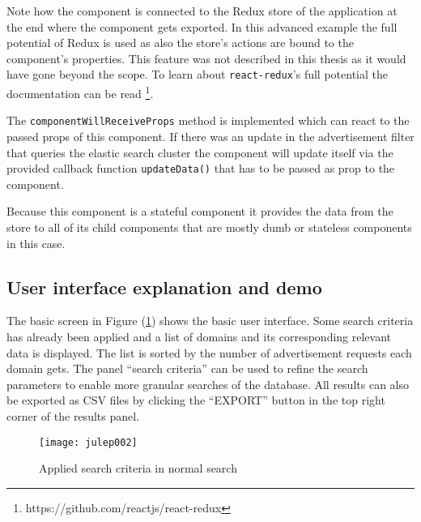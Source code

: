 Note how the component is connected to the Redux store of the application at the end where the component gets exported. In this advanced example the full potential of Redux is used as also the store's actions are bound to the component's properties. This feature was not described in this thesis as it would have gone beyond the scope. To learn about \texttt{react-redux}'s full potential the documentation can be read \footnote{https://github.com/reactjs/react-redux}.

The \texttt{componentWillReceiveProps} method is implemented which can react to the passed props of this component. If there was an update in the advertisement filter that queries the elastic search cluster the component will update itself via the provided callback function \texttt{updateData()} that has to be passed as prop to the component.

Because this component is a stateful component it provides the data from the store to all of its child components that are mostly dumb or stateless components in this case.



\subsection{User interface explanation and demo}

The basic screen in Figure (\ref{fig:julep002}) shows the basic user interface. Some search criteria has already been applied and a list of domains and its corresponding relevant data is displayed. The list is sorted by the number of advertisement requests each domain gets. The panel \enquote{search criteria} can be used to refine the search parameters to enable more granular searches of the database. All results can also be exported as CSV files by clicking the \enquote{EXPORT} button in the top right corner of the results panel.\newline

\begin{figure}[H]
  \centering
  \texttt{[image: julep002]}
  \caption{Applied search criteria in normal search}
  \label{fig:julep002}
\end{figure}


